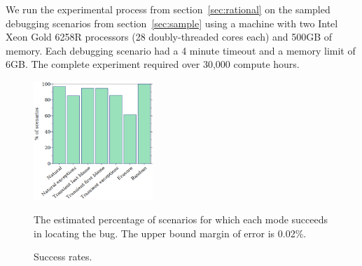 
We run the experimental process from section~\ref{sec:rational} on the
sampled debugging scenarios from section~\ref{sec:sample} using a machine with two Intel Xeon Gold 6258R processors (28 doubly-threaded cores each) and 500GB of memory.
Each debugging scenario had a 4 minute timeout and a
memory limit of 6GB. The complete experiment required
over 30,000 compute hours.


\begin{figure}
  \includegraphics[width=0.40\textwidth]{./plots/success-bars}

  \vspace{1em}
  \begin{minipage}{0.95\textwidth}
  The estimated percentage of scenarios for which each mode succeeds in locating the bug.
  The upper bound margin of error is 0.02\%.
  \end{minipage}

  \caption{Success rates.}
  \label{fig:success-bars}
\end{figure}

